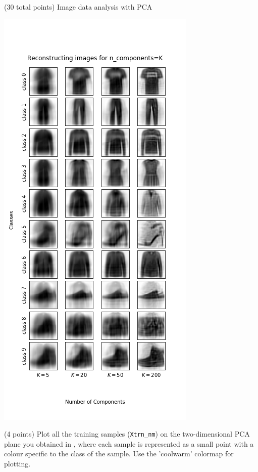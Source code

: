 \documentclass[12pt]{article}
\begin{document}
\begin{question}{(30 total points) Image data analysis with PCA}
\begin{subquestion}
      \begin{answerbox}{52em}
         \begin{center}
             \includegraphics[scale=0.75]{results/1_7.png}
         \end{center}
      \end{answerbox}
  


   \end{subquestion}
   \begin{subquestion}{(4 points)
       Plot all the training samples (\texttt{Xtrn\_nm}) on the
       two-dimensional PCA plane you obtained in , where each sample is
       represented as a small point with a colour specific to the class of
       the sample.  Use the 'coolwarm' colormap for plotting.
     } \label{Q1.8}



\end{subquestion}
\end{question}
\end{document}
